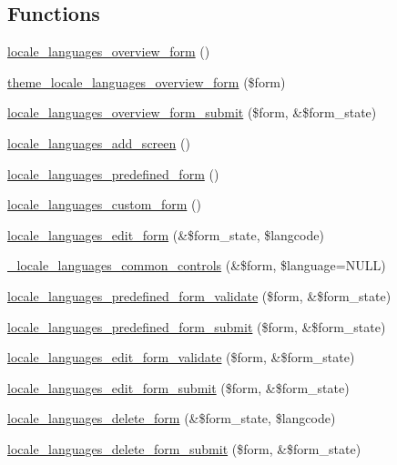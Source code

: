 \subsection*{Functions}
\begin{CompactItemize}
\item 
\hyperlink{group__locale_g6cdda3c5c776e4c263ace510317cdeed}{locale\_\-languages\_\-overview\_\-form} ()
\item 
\hyperlink{group__themeable_gc8da78f85ea472d2e50a0f32047c245f}{theme\_\-locale\_\-languages\_\-overview\_\-form} (\$form)
\item 
\hyperlink{group__locale_g957be3bb6cd02af2ff2acd887fc2b3fe}{locale\_\-languages\_\-overview\_\-form\_\-submit} (\$form, \&\$form\_\-state)
\item 
\hyperlink{group__locale_g717959709d412fc1039f7436501dbf49}{locale\_\-languages\_\-add\_\-screen} ()
\item 
\hyperlink{group__locale_ga8a3a758f48d2d2e1e7746dbb6ece613}{locale\_\-languages\_\-predefined\_\-form} ()
\item 
\hyperlink{group__locale_g37f39352a275f470e0acce3157108b76}{locale\_\-languages\_\-custom\_\-form} ()
\item 
\hyperlink{group__locale_g7509cf7dde8125ba91c2f93d7a42ded1}{locale\_\-languages\_\-edit\_\-form} (\&\$form\_\-state, \$langcode)
\item 
\hyperlink{group__locale_ga662af294a8422d2b73e6e05288b1b8d}{\_\-locale\_\-languages\_\-common\_\-controls} (\&\$form, \$language=NULL)
\item 
\hyperlink{group__locale_g4298724abc57b7d2622a2c9642b4f742}{locale\_\-languages\_\-predefined\_\-form\_\-validate} (\$form, \&\$form\_\-state)
\item 
\hyperlink{group__locale_g83df19c32a63b094d033d0802d74d7cd}{locale\_\-languages\_\-predefined\_\-form\_\-submit} (\$form, \&\$form\_\-state)
\item 
\hyperlink{group__locale_g0d97a3815fcd49bb49ed59dc77ebb802}{locale\_\-languages\_\-edit\_\-form\_\-validate} (\$form, \&\$form\_\-state)
\item 
\hyperlink{group__locale_g749200a912dbb5d31c5403d3fd909741}{locale\_\-languages\_\-edit\_\-form\_\-submit} (\$form, \&\$form\_\-state)
\item 
\hyperlink{group__locale_ga207017c2a9b12c01b98bb40193d6acd}{locale\_\-languages\_\-delete\_\-form} (\&\$form\_\-state, \$langcode)
\item 
\hyperlink{group__locale_gdbf1eb80de38d65bda55e63699822e3c}{locale\_\-languages\_\-delete\_\-form\_\-submit} (\$form, \&\$form\_\-state)

\end{CompactItemize}
